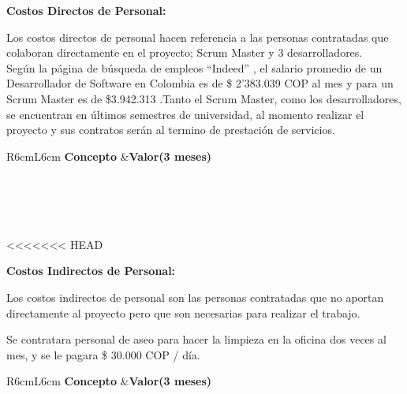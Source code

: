 \documentclass[a4paper,12 pt]{article}
\begin{document}
\textbf{Costos Directos de Personal:}

Los costos directos de personal hacen referencia a las personas contratadas que
colaboran directamente en el proyecto; Scrum Master y 3 desarrolladores.\\

Según la página de búsqueda de empleos “Indeed” \cite{01}, el salario promedio de un
Desarrollador de Software en Colombia es de \$ 2’383.039 COP al mes y para un Scrum
Master es de \$3.942.313 .Tanto el Scrum Master, como los desarrolladores, se encuentran
en últimos semestres de universidad, al momento realizar el proyecto y sus contratos
serán al termino de prestación de servicios. 

\begin{table}[H]
    \centering
    \small{
    \begin{tabular}{R{6cm}L{6cm}}
        \textbf{Concepto}   &\textbf{Valor(3 meses)}\\
        \\
         \\
         \\
        \hline
         \\
    \end{tabular}
    \label{T04}}
<<<<<<< HEAD
\end{table}{}


\textbf{Costos Indirectos de Personal:}


Los costos indirectos de personal son las personas contratadas que no aportan directamente al proyecto pero que son necesarias para realizar el trabajo.

Se contratara personal de aseo para hacer la limpieza en la oficina dos veces al mes, y se le pagara \$ 30.000 COP / día.

\begin{table}[H]
    \centering
    \small{
    \begin{tabular}{R{6cm}L{6cm}}
        \textbf{Concepto}   &\textbf{Valor(3 meses)}\\
        \\
         \\
        \hline
         \\
    \end{tabular}
    \label{T201}}
\end{table}{}
\end{document}
